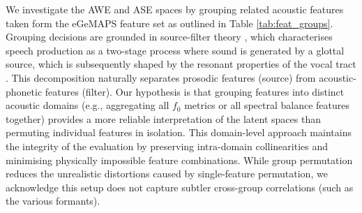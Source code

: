 \documentclass[conference,letterpaper]{IEEEtran}
\begin{document}
We investigate the AWE and ASE spaces by grouping related acoustic features taken form the eGeMAPS feature set as outlined in Table \ref{tab:feat_groups}. Grouping decisions are grounded in source-filter theory \cite{fant1981source}, which characterises speech production as a two-stage process where sound is generated by a glottal source, which is subsequently shaped by the resonant properties of the vocal tract \cite{10.1093/acrefore/9780199384655.013.894, jm3}. This decomposition naturally separates prosodic features (source) from acoustic-phonetic features (filter). Our hypothesis is that grouping features into distinct acoustic domains (e.g., aggregating all $f_0$ metrics or all spectral balance features together) provides a more reliable interpretation of the latent spaces than permuting individual features in isolation. This domain-level approach maintains the integrity of the evaluation by preserving intra-domain collinearities and minimising physically impossible feature combinations. While group permutation reduces the unrealistic distortions caused by single-feature permutation, we acknowledge this setup does not capture subtler cross-group correlations (such as the various formants).


\begin{table}[H]
\centering
\caption{Acoustic feature groups derived from eGeMAPS used in the interpretability analysis.}
\label{tab:feat_groups}
\end{table}
\end{document}
